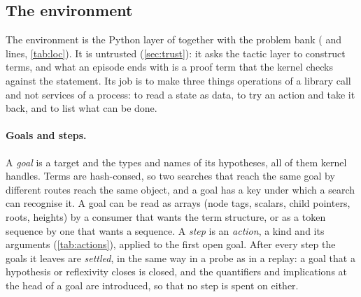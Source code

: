 \subsection{The environment}\label{sec:env}

The environment is the Python layer of  together with the problem bank (\locenvdir{} and \locprobdir{} lines, \cref{tab:loc}).
It is untrusted (\cref{sec:trust}): it asks the tactic layer to construct terms, and what an episode ends with is a proof term that the kernel checks against the statement.
Its job is to make three things operations of a library call and not services of a process: to read a state as data, to try an action and take it back, and to list what can be done.

\paragraph{Goals and steps.}
A \emph{goal} is a target and the types and names of its hypotheses, all of them kernel handles.
Terms are hash-consed, so two searches that reach the same goal by different routes reach the same object, and a goal has a key under which a search can recognise it.
A goal can be read as arrays (node tags, scalars, child pointers, roots, heights) by a consumer that wants the term structure, or as a token sequence by one that wants a sequence.
A \emph{step} is an \emph{action}, a kind and its arguments (\cref{tab:actions}), applied to the first open goal.
After every step the goals it leaves are \emph{settled}, in the same way in a probe as in a replay: a goal that a hypothesis or reflexivity closes is closed, and the quantifiers and implications at the head of a goal are introduced, so that no step is spent on either.

